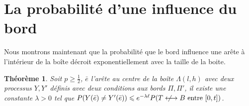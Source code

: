 \documentclass[titlepage,a4paper,12pt]{article}
\newcounter{thm}
\newtheorem{cvg}[thm]{Théorème}
\newcommand{\nlongleftrightarrow}{\longleftrightarrow \kern-15pt\not \kern15pt}
\begin{document}
\section{La probabilité d'une influence du bord}

Nous montrons maintenant que la probabilité que le bord influence une arête à l'intérieur de la boîte décroit exponentiellement avec la taille de la boite. 
\begin{cvg}
Soit $p\geqslant \frac{1}{2}$, $\bar{e}$ l'arête au centre de la boîte $\Lambda(l,h)$ avec deux processus $Y,Y'$ définis avec deux conditions aux bords $\Pi, \Pi'$, il existe une constante $\lambda> 0$ tel que $P(Y(\bar{e})\neq Y'(\bar{e})) \leqslant e^{-\lambda \ell} P(T\nlongleftrightarrow B \text{ entre }[0,t])$.
\end{cvg}
\end{document}
